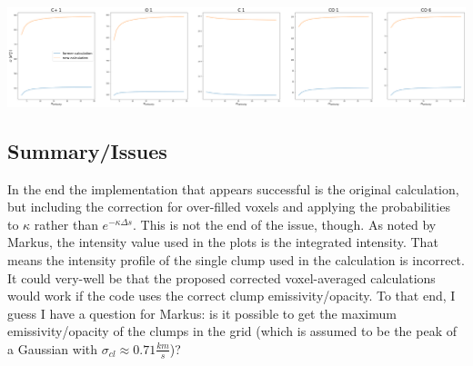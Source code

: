 \documentclass[a4paper]{article}
\begin{document}
    \includegraphics*[width=\linewidth]{voxel_convergence_n_velocity.png}

    \subsection{Summary/Issues}

    In the end the implementation that appears successful is the original calculation, but including the correction for over-filled voxels and applying the probabilities to \(\kappa\) rather than \(e^{-\kappa \Delta s}\).
    This is not the end of the issue, though.
    As noted by Markus, the intensity value used in the plots is the integrated intensity.
    That means the intensity profile of the single clump used in the calculation is incorrect.
    It could very-well be that the proposed corrected voxel-averaged calculations would work if the code uses the correct clump emissivity/opacity.
    To that end, I guess I have a question for Markus: is it possible to get the maximum emissivity/opacity of the clumps in the grid (which is assumed to be the peak of a Gaussian with \(\sigma_{cl} \approx 0.71 \frac{km}{s}\))?
\end{document}
